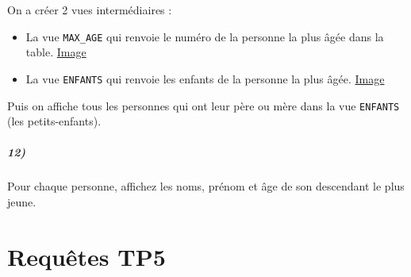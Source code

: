 \documentclass{report}
\begin{document}
On a créer 2 vues intermédiaires :
\begin{itemize}
	\item La vue {\tt MAX\_AGE} qui renvoie le numéro de la personne la plus âgée dans la table. \href{run:./Images/TP7/tp7_vue7.png}{Image}
	\item La vue {\tt ENFANTS} qui renvoie les enfants de la personne la plus âgée. \href{run:./Images/TP7/tp7_vue8.png}{Image}
\end{itemize}

Puis on affiche tous les personnes qui ont leur père ou mère dans la vue {\tt ENFANTS} (les petits-enfants).

\paragraph{12)}Pour chaque personne, affichez les noms, prénom et âge de son descendant le plus jeune.


\appendix

\chapter{Requêtes TP5}
\label{AnnexeA}
\end{document}
